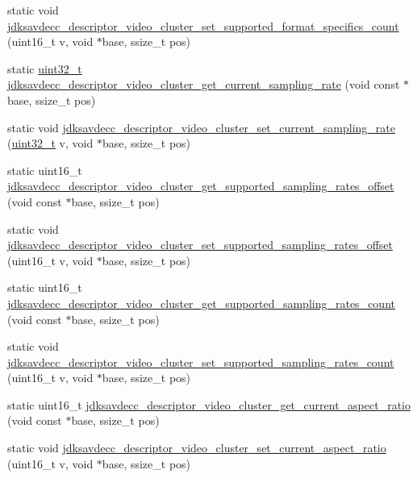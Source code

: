 \begin{DoxyCompactItemize}
static void \hyperlink{group__descriptor__video__cluster_gac7230d70ddc2aaebb011eba1e80d82ed}{jdksavdecc\+\_\+descriptor\+\_\+video\+\_\+cluster\+\_\+set\+\_\+supported\+\_\+format\+\_\+specifics\+\_\+count} (uint16\+\_\+t v, void $\ast$base, ssize\+\_\+t pos)
\item 
static \hyperlink{parse_8c_a6eb1e68cc391dd753bc8ce896dbb8315}{uint32\+\_\+t} \hyperlink{group__descriptor__video__cluster_ga4301969a1823c18cebc2c6ccafbe9990}{jdksavdecc\+\_\+descriptor\+\_\+video\+\_\+cluster\+\_\+get\+\_\+current\+\_\+sampling\+\_\+rate} (void const $\ast$base, ssize\+\_\+t pos)
\item 
static void \hyperlink{group__descriptor__video__cluster_gaa121797683aa48d916ed8479214781c0}{jdksavdecc\+\_\+descriptor\+\_\+video\+\_\+cluster\+\_\+set\+\_\+current\+\_\+sampling\+\_\+rate} (\hyperlink{parse_8c_a6eb1e68cc391dd753bc8ce896dbb8315}{uint32\+\_\+t} v, void $\ast$base, ssize\+\_\+t pos)
\item 
static uint16\+\_\+t \hyperlink{group__descriptor__video__cluster_ga0abc0c7b8f8b375494b25d1fd2fc985d}{jdksavdecc\+\_\+descriptor\+\_\+video\+\_\+cluster\+\_\+get\+\_\+supported\+\_\+sampling\+\_\+rates\+\_\+offset} (void const $\ast$base, ssize\+\_\+t pos)
\item 
static void \hyperlink{group__descriptor__video__cluster_gae7efac92409d5a34d5e55f5981694d95}{jdksavdecc\+\_\+descriptor\+\_\+video\+\_\+cluster\+\_\+set\+\_\+supported\+\_\+sampling\+\_\+rates\+\_\+offset} (uint16\+\_\+t v, void $\ast$base, ssize\+\_\+t pos)
\item 
static uint16\+\_\+t \hyperlink{group__descriptor__video__cluster_gaa8843af85f40ba23ee412639f13e9dc4}{jdksavdecc\+\_\+descriptor\+\_\+video\+\_\+cluster\+\_\+get\+\_\+supported\+\_\+sampling\+\_\+rates\+\_\+count} (void const $\ast$base, ssize\+\_\+t pos)
\item 
static void \hyperlink{group__descriptor__video__cluster_ga44f6c80d4dbaa7716d09f6b755e2434a}{jdksavdecc\+\_\+descriptor\+\_\+video\+\_\+cluster\+\_\+set\+\_\+supported\+\_\+sampling\+\_\+rates\+\_\+count} (uint16\+\_\+t v, void $\ast$base, ssize\+\_\+t pos)
\item 
static uint16\+\_\+t \hyperlink{group__descriptor__video__cluster_ga0143cf82227db8f2fdc66a0304c589e1}{jdksavdecc\+\_\+descriptor\+\_\+video\+\_\+cluster\+\_\+get\+\_\+current\+\_\+aspect\+\_\+ratio} (void const $\ast$base, ssize\+\_\+t pos)
\item 
static void \hyperlink{group__descriptor__video__cluster_ga4ffa3750540e67a7fb0814d16d85477f}{jdksavdecc\+\_\+descriptor\+\_\+video\+\_\+cluster\+\_\+set\+\_\+current\+\_\+aspect\+\_\+ratio} (uint16\+\_\+t v, void $\ast$base, ssize\+\_\+t pos)

\end{DoxyCompactItemize}
